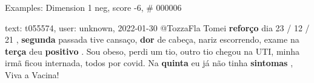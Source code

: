 \begin{frame}{Examples: Dimension 1 neg, score -6, \# 000006}
\footnotesize
\begin{alertblock}{text: t055574, user: unknown, 2022-01-30}
@TozzaFla Tomei \textbf{reforço} dia 23 / 12 / 21 , \textbf{segunda} passada 
tive cansaço, \textbf{dor} de cabeça, nariz escorrendo, exame na \textbf{terça} 
deu \textbf{positivo} . Sou obeso, perdi um tio, outro tio chegou na UTI, minha 
irmã ficou internada, todos por covid. Na \textbf{quinta} eu já não tinha 
\textbf{sintomas} , Viva a Vacina! 
\end{alertblock}
\end{frame}
